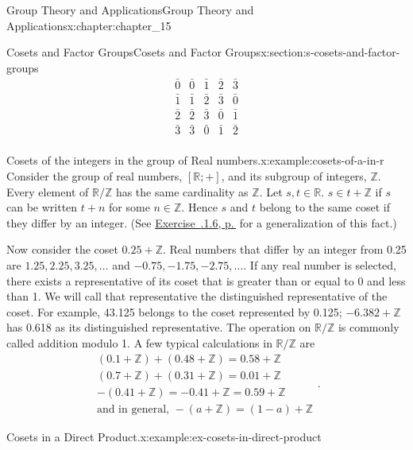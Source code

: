\documentclass[twoside,10pt,]{book}
\newcommand{\xreffont}{\relax}
\numberwithin{equation}{section}
\begin{document}
\begin{chapterptx}{Group Theory and Applications}{}{Group Theory and Applications}{}{}{x:chapter:chapter_15}
\begin{sectionptx}{Cosets and Factor Groups}{}{Cosets and Factor Groups}{}{}{x:section:s-cosets-and-factor-groups}
\begin{equation*}
\begin{array}{c|cccc}
\bar{0} & \bar{0} & \bar{1}  & \bar{2}  & \bar{3}\\
\bar{1} & \bar{1} & \bar{2}  & \bar{3} & \bar{0}\\
\bar{2} & \bar{2}  &\bar{3} & \bar{0} & \bar{1}\\
\bar{3} & \bar{3}& \bar{0}   & \bar{1} & \bar{2} \\
\end{array}
\end{equation*}
%
\begin{example}{Cosets of the integers in the group of Real numbers.}{x:example:cosets-of-a-in-r}%
Consider the group of real numbers, \([\mathbb{R}; +]\), and its subgroup of integers, \(\mathbb{Z}\). Every element of \(\mathbb{R}/\mathbb{Z}\) has the same cardinality as \(\mathbb{Z}\). Let \(s, t\in \mathbb{R}\). \(s\in t+\mathbb{Z}\) if \(s\) can be written \(t+n\) for some \(n \in \mathbb{Z}\).  Hence \(s\) and \(t\) belong to the same coset if they differ by an integer. (See \hyperlink{x:exercise:exercise-15-2-6}{Exercise~{\xreffont 15.2.1.6}, p.\,\pageref{x:exercise:exercise-15-2-6}} for a generalization of this fact.)%
\par
Now consider the coset \(0.25+\mathbb{Z}\). Real numbers that differ by an integer from 0.25 are \(1.25, 2.25, 3.25, \ldots\) and \(-0.75, -1.75, -2.75, \ldots\).  If any real number is selected, there exists a representative of its coset that is greater than or equal to 0 and less than 1. We will call that representative the distinguished representative of the coset. For example, 43.125 belongs to the coset represented by 0.125; \(-6.382+\mathbb{Z}\) has 0.618 as its distinguished representative. The operation on \(\mathbb{R}/\mathbb{Z}\) is commonly called addition modulo 1. A few typical calculations in \(\mathbb{R}/\mathbb{Z}\) are%
\begin{equation*}
\begin{array}{c}
(0.1+\mathbb{Z})+(0.48+\mathbb{Z}) = 0.58+\mathbb{Z}\\
(0.7+\mathbb{Z})+(0.31+\mathbb{Z}) = 0.01+\mathbb{Z}\\
-(0.41+\mathbb{Z}) = -0.41+\mathbb{Z} = 0.59+\mathbb{Z}\\
\textrm{and in general, } -(a+\mathbb{Z}) = (1 - a)+\mathbb{Z}
\end{array}\text{.}
\end{equation*}
%
\end{example}
\begin{example}{Cosets in a Direct Product.}{x:example:ex-cosets-in-direct-product}%

\end{example}
\end{sectionptx}
\end{chapterptx}
\end{document}
